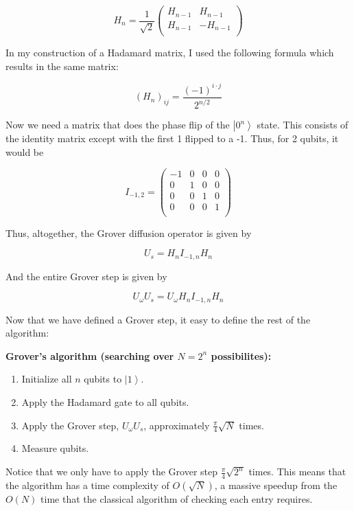 \documentclass[11pt]{report}
\newcommand{\?}{\stackrel{?}{=}}
\begin{document}
$$H_{n}=\frac{1}{\sqrt{2}}\begin{pmatrix}
H_{n-1} & H_{n-1} \\
H_{n-1} & -H_{n-1} \\
\end{pmatrix}$$

In my construction of a Hadamard matrix, I used the following formula which results in the same matrix:

$$(H_{n})_{ij}= \frac{(-1)^{i\cdot j}}{2^{n/2}} $$

Now we need a matrix that does the phase flip of the $\left | 0^n \right \rangle$ state. This consists of the identity matrix except with the first 1 flipped to a -1. Thus, for 2 qubits, it would be

$$I_{-1,2}=\begin{pmatrix}
-1 & 0 & 0 & 0 \\
0 & 1 & 0 & 0 \\
0 & 0 & 1 & 0 \\
0 & 0 & 0 & 1 \\
\end{pmatrix}$$

Thus, altogether, the Grover diffusion operator is given by

$$U_{s}=H_{n} I_{-1,n} H_{n}$$

And the entire Grover step is given by

$$U_{\omega} U_{s} = U_{\omega} H_{n} I_{-1,n} H_{n}$$

Now that we have defined a Grover step, it easy to define the rest of the algorithm:

\begin{framed}
\textbf{Grover's algorithm (searching over $N=2^{n}$ possibilites):}
\begin{enumerate}
	\item Initialize all $n$ qubits to $\left | 1 \right \rangle$.
	\item Apply the Hadamard gate to all qubits.
	\item Apply the Grover step, $U_{\omega} U_{s}$, approximately $\frac{\pi}{4} \sqrt{N}$ times.
	\item Measure qubits.
\end{enumerate}
\end{framed}

Notice that we only have to apply the Grover step $\frac{\pi}{4} \sqrt{2^{n}}$ times. This means that the algorithm has a time complexity of $O(\sqrt{N})$, a massive speedup from the $O(N)$ time that the classical algorithm of checking each entry requires.
\end{document}
